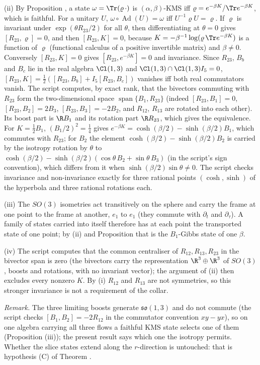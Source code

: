 (ii) By Proposition , a state $\omega = \Tr(\varrho\,\cdot)$ is $(\alpha,\beta)$-KMS iff $\varrho = e^{-\beta K}/\Tr e^{-\beta K}$, which is faithful. For a unitary $U$, $\omega\circ\operatorname{Ad}(U) = \omega$ iff $U^{-1}\varrho U = \varrho$. If $\varrho$ is invariant under $\exp(\theta R_{23}/2)$ for all $\theta$, then differentiating at $\theta = 0$ gives $[R_{23}, \varrho] = 0$, and then $[R_{23}, K] = 0$, because $K = -\beta^{-1}\log(\varrho\,\Tr e^{-\beta K})$ is a function of $\varrho$ (functional calculus of a positive invertible matrix) and $\beta \ne 0$. Conversely $[R_{23}, K] = 0$ gives $[R_{23}, e^{-\beta K}] = 0$ and invariance. Since $R_{23}$, $B_{b}$ and $B_{c}$ lie in the real algebra $\Cl(1,3)$ and $\Cl(1,3) \cap \Cl(1,3)I_{5} = 0$, $[R_{23}, K] = \tfrac12([R_{23}, B_{b}] + I_{5}[R_{23}, B_{c}])$ vanishes iff both real commutators vanish. The script computes, by exact rank, that the bivectors commuting with $R_{23}$ form the two-dimensional space $\operatorname{span}\{B_{1}, R_{23}\}$ (indeed $[R_{23}, B_{1}] = 0$, $[R_{23}, B_{2}] = 2B_{3}$, $[R_{23}, B_{3}] = -2B_{2}$, and $R_{12}$, $R_{13}$ are rotated into each other). Its boost part is $\R B_{1}$ and its rotation part $\R R_{23}$, which gives the equivalence. For $K = \tfrac12 B_{1}$, $(B_{1}/2)^{2} = \tfrac14$ gives $e^{-\beta K} = \cosh(\beta/2) - \sinh(\beta/2)B_{1}$, which commutes with $R_{23}$; for $B_{2}$ the element $\cosh(\beta/2) - \sinh(\beta/2)B_{2}$ is carried by the isotropy rotation by $\theta$ to $\cosh(\beta/2) - \sinh(\beta/2)(\cos\theta\,B_{2} + \sin\theta\,B_{3})$ (in the script's sign convention), which differs from it when $\sinh(\beta/2)\sin\theta \ne 0$. The script checks invariance and non-invariance exactly for three rational points $(\cosh, \sinh)$ of the hyperbola and three rational rotations each.

(iii) The $SO(3)$ isometries act transitively on the sphere and carry the frame at one point to the frame at another, $e_{1}$ to $e_{1}$ (they commute with $\partial_{t}$ and $\partial_{\tau}$). A family of states carried into itself therefore has at each point the transported state of one point; by (ii) and Proposition  that is the $B_{1}$-Gibbs state of one $\beta$.

(iv) The script computes that the common centraliser of $R_{12}, R_{13}, R_{23}$ in the bivector span is zero (the bivectors carry the representation $\R^{3} \oplus \R^{3}$ of $SO(3)$, boosts and rotations, with no invariant vector); the argument of (ii) then excludes every nonzero $K$. By (i) $R_{12}$ and $R_{13}$ are not symmetries, so this stronger invariance is not a requirement of the collar.

\emph{Remark.} The three limiting boosts generate $\mathfrak{so}(1,3)$ and do not commute (the script checks $[B_{1}, B_{2}] = -2R_{12}$ in the commutator convention $xy - yx$), so on one algebra carrying all three flows a faithful KMS state selects one of them (Proposition (iii)); the present result says which one the isotropy permits. Whether the slice states extend along the $r$-direction is untouched: that is hypothesis (C) of Theorem .
